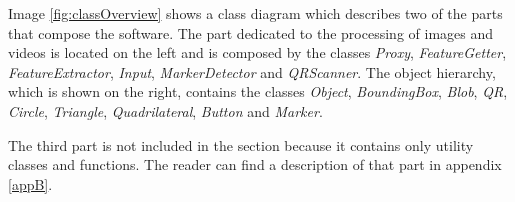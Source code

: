 	Image \ref{fig:classOverview} shows a class diagram which describes two of the parts that compose the software. 
	The part dedicated to the processing of images and videos is located on the left and is composed by the classes \emph{Proxy}, \emph{FeatureGetter}, \emph{FeatureExtractor}, \emph{Input}, \emph{MarkerDetector} and \emph{QRScanner}.
	The object hierarchy, which is shown on the right, contains the classes \emph{Object}, \emph{BoundingBox}, \emph{Blob}, \emph{QR}, \emph{Circle}, \emph{Triangle}, \emph{Quadrilateral}, \emph{Button} and \emph{Marker}.

	The third part is not included in the section because it contains only utility classes and functions. 
	The reader can find a description of that part in appendix \ref{appB}. 

	
